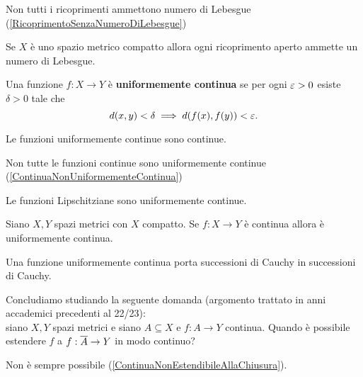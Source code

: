 \begin{multicols*}{2}
\begin{remark}
Non tutti i ricoprimenti ammettono numero di Lebesgue (\ref{RicoprimentoSenzaNumeroDiLebesgue})
\end{remark}


\begin{theorem}\label{InCompattoOgniRicoprimentoAmmetteNumeroDiLebesgue}
Se $X$ è uno spazio metrico compatto allora ogni ricoprimento aperto ammette un numero di Lebesgue.
\end{theorem}

\begin{definition}
Una funzione $f:X\to Y$ è \textbf{uniformemente continua} se per ogni $\varepsilon>0$ esiste $\delta>0$ tale che \[d(x,y)<\delta\implies d(f(x),f(y))<\varepsilon.\]
\end{definition}
\begin{remark}
Le funzioni uniformemente continue sono continue.
\end{remark}
\begin{remark}
Non tutte le funzioni continue sono uniformemente continue (\ref{ContinuaNonUniformementeContinua})
\end{remark}

\begin{remark}
Le funzioni Lipschitziane sono uniformemente continue.
\end{remark}

\begin{theorem}\label{TeoremaHeineCantor}
Siano $X,Y$ spazi metrici con $X$ compatto. Se $f:X\to Y$ è continua allora è uniformemente continua.
\end{theorem}

\begin{remark}
Una funzione uniformemente continua porta successioni di Cauchy in successioni di Cauchy.
\end{remark}
\vspace{0.5cm}

\noindent Concludiamo studiando la seguente domanda (argomento trattato in anni accademici precedenti al 22/23):\\
siano $X,Y$ spazi metrici e siano $A\subseteq X$ e $f:A\to Y$ continua. Quando è possibile estendere $f$ a $f:\overline{A}\to Y$ in modo continuo?

\begin{remark}
Non è sempre possibile (\ref{ContinuaNonEstendibileAllaChiusura}).
\end{remark}


\end{multicols*}
